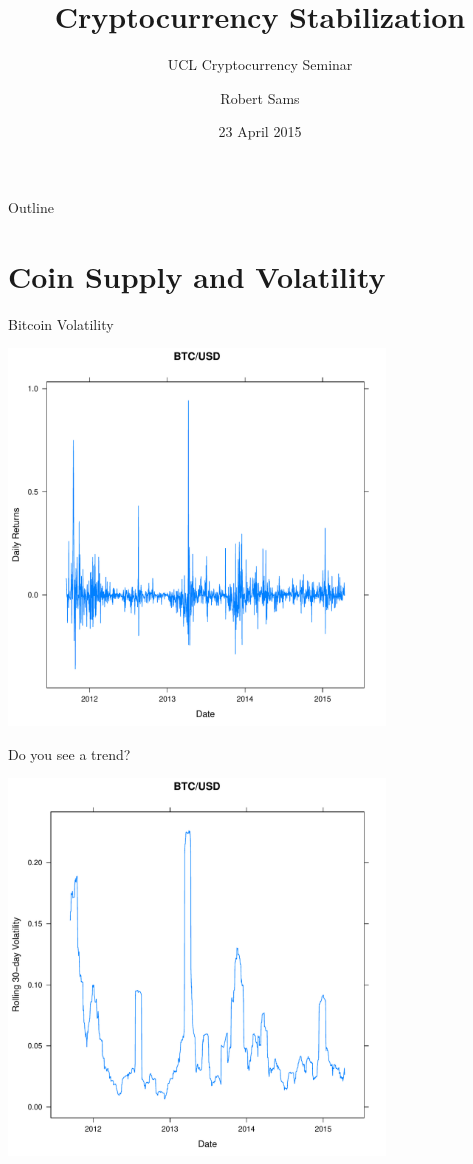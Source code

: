 \documentclass{beamer}
\title{Cryptocurrency Stabilization}
\subtitle{UCL Cryptocurrency Seminar}
\author{Robert Sams}
\date{23 April 2015}
\begin{document}
\begin{frame}
  \titlepage
\end{frame}

\begin{frame}{Outline}
  \tableofcontents
\end{frame}

\section{Coin Supply and Volatility}

\begin{frame}{Bitcoin Volatility}
  \begin{center}
    \includegraphics[keepaspectratio,width=0.75\textwidth]{btcror.pdf} 
  \end{center}
\end{frame}

\begin{frame}{Do you see a trend?}
  \begin{center}
    \includegraphics[keepaspectratio,width=0.75\textwidth]{btcvol.pdf} 
  \end{center}
\end{frame}
\end{document}
